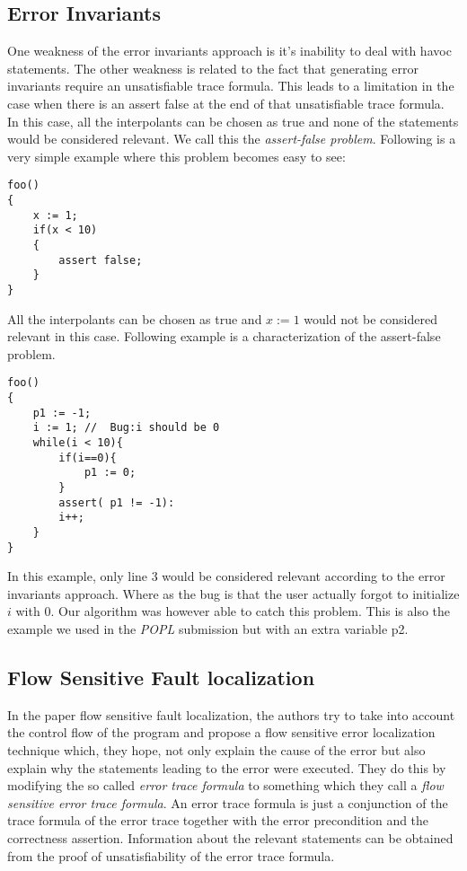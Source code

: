 \documentclass{article}
\begin{document}
\subsection{Error Invariants}
One weakness of the error invariants approach \cite{errorinvariants} is it's inability to deal with havoc statements. The other weakness is related to the fact that generating error invariants require an unsatisfiable trace formula. This leads to a limitation in the case when there is an assert false at the end of that unsatisfiable trace formula. In this case, all the interpolants can be chosen as true and none of the statements would be considered relevant. We call this the \textit{assert-false problem}. Following is a very simple example where this problem becomes easy to see:
\begin{lstlisting}
foo()
{ 
	x := 1;
	if(x < 10)
	{
		assert false;	
	}	
}
\end{lstlisting}
All the interpolants can be chosen as true and $x:=1$ would not be considered relevant in this case. Following example is a characterization of the assert-false problem.
\begin{lstlisting}
foo()
{ 
	p1 := -1;
	i := 1; //  Bug:i should be 0
	while(i < 10){
		if(i==0){
			p1 := 0;		
		}
		assert( p1 != -1):
		i++;	
	}
}
\end{lstlisting}
In this example, only line 3 would be considered relevant according to the error invariants approach. Where as the bug is that the user actually forgot to initialize $i$ with 0. Our algorithm was however able to catch this problem. This is also the example we used in the \textit{POPL} submission but with an extra variable p2.

\subsection{Flow Sensitive Fault localization} 
In the paper flow sensitive fault localization\cite{faultlocalization}, the authors try to take into account the control flow of the program and propose a flow sensitive error localization technique which, they hope, not only explain the cause of the error but also explain why the statements leading to the error were executed. They do this by modifying the so called \textit{error trace formula} to something which they call a \textit{flow sensitive error trace formula}. An error trace formula is just a conjunction of the trace formula of the error trace together with the error precondition and the correctness assertion. Information about the relevant statements can be obtained from the proof of unsatisfiability of the error trace formula.
\end{document}
